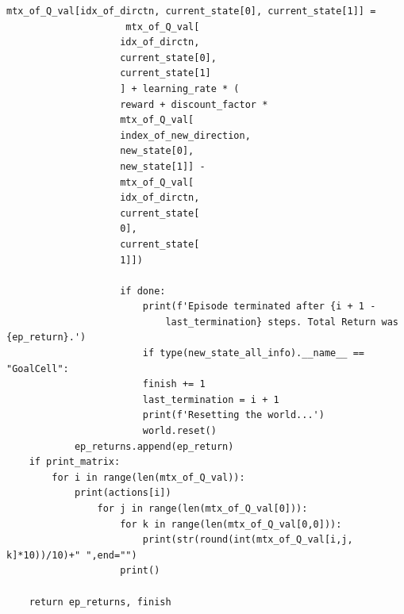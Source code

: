 \documentclass[a4paper, twoside, english]{article}
\begin{document}
\begin{lstlisting}[language=iPython]
					mtx_of_Q_val[idx_of_dirctn, current_state[0], current_state[1]] =
					 mtx_of_Q_val[
					idx_of_dirctn,
					current_state[0],
					current_state[1]
					] + learning_rate * (
					reward + discount_factor *
					mtx_of_Q_val[
					index_of_new_direction,
					new_state[0],
					new_state[1]] -
					mtx_of_Q_val[
					idx_of_dirctn,
					current_state[
					0],
					current_state[
					1]])
					
					if done:
						print(f'Episode terminated after {i + 1 - 
							last_termination} steps. Total Return was {ep_return}.')
						if type(new_state_all_info).__name__ == "GoalCell":
						finish += 1
						last_termination = i + 1
						print(f'Resetting the world...')
						world.reset()
			ep_returns.append(ep_return)
	if print_matrix:
		for i in range(len(mtx_of_Q_val)):
			print(actions[i])
				for j in range(len(mtx_of_Q_val[0])):
					for k in range(len(mtx_of_Q_val[0,0])):
						print(str(round(int(mtx_of_Q_val[i,j, k]*10))/10)+" ",end="")
					print()
	
	return ep_returns, finish
\end{lstlisting}	

\newpage
\end{document}
